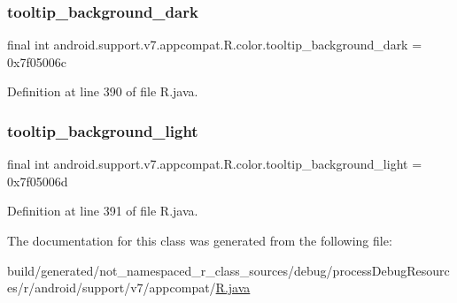 \subsubsection{\texorpdfstring{tooltip\_background\_dark}{tooltip\_background\_dark}}
{\footnotesize\ttfamily final int android.\+support.\+v7.\+appcompat.\+R.\+color.\+tooltip\+\_\+background\+\_\+dark = 0x7f05006c\hspace{0.3cm}{\ttfamily [static]}}



Definition at line 390 of file R.\+java.

\mbox{\label{classandroid_1_1support_1_1v7_1_1appcompat_1_1_r_1_1color_aaebcd03ad73492f72e31f7ae1a5e949f}} 
\subsubsection{\texorpdfstring{tooltip\_background\_light}{tooltip\_background\_light}}
{\footnotesize\ttfamily final int android.\+support.\+v7.\+appcompat.\+R.\+color.\+tooltip\+\_\+background\+\_\+light = 0x7f05006d\hspace{0.3cm}{\ttfamily [static]}}



Definition at line 391 of file R.\+java.



The documentation for this class was generated from the following file\+:\begin{DoxyCompactItemize}
\item 
build/generated/not\+\_\+namespaced\+\_\+r\+\_\+class\+\_\+sources/debug/process\+Debug\+Resources/r/android/support/v7/appcompat/\mbox{\hyperlink{android_2support_2v7_2appcompat_2_r_8java}{R.\+java}}\end{DoxyCompactItemize}
